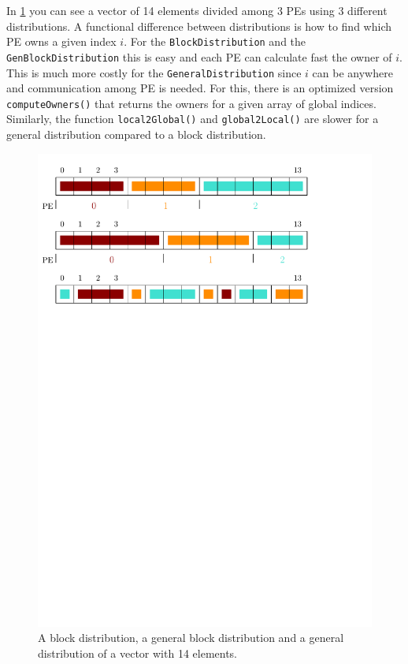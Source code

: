 \documentclass[a4paper,10pt]{article}
\newcommand{\MI}[1]{\texttt{#1}}
\begin{document}
In \cref{fig:dist} you can see a vector of 14 elements divided among 3 PEs using 3 different 
distributions. A functional difference between distributions is how to find which PE owns a given
index $i$. For the \MI{BlockDistribution} and the \MI{GenBlockDistribution} this is easy and each
PE can calculate fast the owner of $i$. This is much more costly for the \MI{GeneralDistribution} 
since $i$ can be anywhere and communication among PE is needed.
For this, there is an optimized version \MI{computeOwners()} that returns the owners 
for a given array of global indices. 
Similarly, the function \MI{local2Global()} and \MI{global2Local()} are slower
for a general distribution compared to a block distribution.

\begin{figure}
\centering
\includegraphics[scale=0.7]{vector_dist}
\caption{A block distribution, a general block distribution and a general distribution of a vector
with 14 elements.}
\label{fig:dist}
\end{figure}
\end{document}
